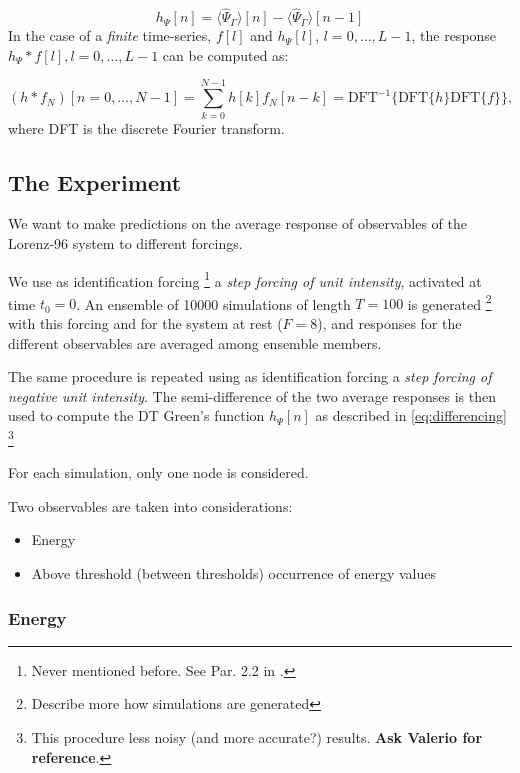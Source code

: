 \documentclass{article}
\begin{document}
\begin{equation} \label{eq:differencing}
h_{\Psi}[n]=\langle\hat{\Psi}_{\Gamma}\rangle[n]-\langle\hat{\Psi}_{\Gamma}\rangle[n-1]
\end{equation}
In the case of a \textit{finite} time-series, $f[l]$ and $h_{\Psi}[l]$, $l=0, \dots, L-1$, the response $h_{\Psi} * f[l], l=0, \dots, L-1$ can be computed as:

\begin{equation}
\left(h * f_{N}\right)[n=0, \ldots, N-1]=\sum_{k=0}^{N-1} h[k] f_{N}[n-k]=\mathrm{DFT}^{-1}\{\mathrm{DFT}\{h\} \mathrm{DFT}\{f\}\},
\end{equation}
where DFT is the discrete Fourier transform.

\subsection{The Experiment}

We want to make predictions on the average response of observables of the Lorenz-96 system to different forcings.

We use as identification forcing \footnote{Never mentioned before. See Par. 2.2 in \cite{Bodai}.\label{fn9}} a \textit{step forcing of unit intensity}, activated at time $t_0=0$. An ensemble of 10000 simulations of length $T=100$ is generated \footnote{Describe more how simulations are generated} with this forcing and for the system at rest ($F=8$), and responses for the different observables are averaged among ensemble members.

The same procedure is repeated using as identification forcing a \textit{step forcing of negative unit intensity}. The semi-difference of the two average responses is then used to compute the DT Green's function $h_{\Psi}[n]$ as described in \eqref{eq:differencing} \footnote{This procedure less noisy (and more accurate?) results. \textbf{Ask Valerio for reference}. }

For each simulation, only one node is considered.
 
Two observables are taken into considerations:

\begin{itemize}
	\item Energy
	\item Above threshold (between thresholds) occurrence of energy values
\end{itemize}

\subsubsection{Energy}
\end{document}
